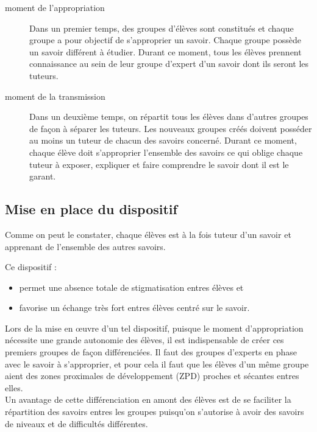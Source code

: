 \begin{description}
    \item[moment de l'appropriation] Dans un premier temps, des groupes d'élèves sont constitués et chaque groupe a pour objectif de s'approprier un savoir. Chaque groupe possède un savoir différent à étudier. Durant ce moment, tous les élèves prennent connaissance au sein de leur groupe d'expert d'un savoir dont ils seront les tuteurs.
    \item[moment de la transmission] Dans un deuxième temps, on répartit tous les élèves dans d'autres groupes de façon à séparer les tuteurs. Les nouveaux groupes créés doivent posséder au moins un tuteur de chacun des savoirs concerné. Durant ce moment, chaque élève doit s'approprier l'ensemble des savoirs ce qui oblige chaque tuteur à exposer, expliquer et faire comprendre le savoir dont il est le garant.
\end{description}



\subsection{Mise en place du dispositif}



Comme on peut le constater, chaque élèves est à la fois tuteur d'un savoir et apprenant de l'ensemble des autres savoirs.

Ce dispositif :

\begin{itemize}
    \item permet une absence totale de stigmatisation entres élèves et 
    \item favorise un échange très fort entres élèves centré sur le savoir.
\end{itemize}

Lors de la mise en œuvre d'un tel dispositif, puisque le moment d'appropriation nécessite une grande autonomie des élèves, il est indispensable de créer ces premiers groupes de façon différenciées. Il faut des groupes d'experts en phase avec le savoir à s'approprier, et pour cela il faut que les élèves d'un même groupe aient des zones proximales de développement (ZPD) proches et sécantes entres elles.
\\
Un avantage de cette différenciation en amont des élèves est de se faciliter la répartition des savoirs entres les groupes puisqu'on s'autorise à avoir des savoirs de niveaux et de difficultés différentes.

